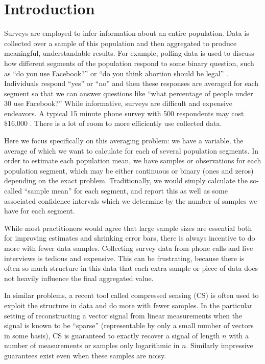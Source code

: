 \section{Introduction}
Surveys are employed to infer information about an entire population.
Data is collected over a sample of this population and then aggregated to produce meaningful, understandable results.
For example, polling data is used to discuss how different segments of the population respond to some binary question, such as ``do you use Facebook?'' or ``do you think abortion should be legal'' \cite{pew2013facebook, pew2013abortion}.
Individuals respond ``yes'' or ``no'' and then these responses are averaged for each segment so that we can answer questions like ``what percentage of people under 30 use Facebook?''
While informative, surveys are difficult and expensive endeavors.
A typical 15 minute phone survey with 500 respondents may cost \$16,000 \cite{wallacecost}.
There is a lot of room to more efficiently use collected data. %

Here we focus specifically on this averaging problem: we have a variable, the average of which we want to calculate for each of several population segments. 
In order to estimate each population mean, we have samples or observations for each population segment, which may be either continuous or binary (ones and zeros) depending on the exact problem. 
Traditionally, we would simply calculate the so-called ``sample mean'' for each segment, and report this as well as some associated confidence intervals which we determine by the number of samples we have for each segment.

While most practitioners would agree that large sample sizes are essential both for improving estimates and shrinking error bars, there is always incentive to do more with fewer data samples.
Collecting survey data from phone calls and live interviews is tedious and expensive.
This can be frustrating, because there is often so much structure in this data that each extra sample or piece of data does not heavily influence the final aggregated value.

In similar problems, a recent tool called compressed sensing (CS) is often used to exploit the structure in data and do more with fewer samples.
In the particular setting of reconstructing a vector signal from linear measurements when the signal is known to be ``sparse'' (representable by only a small number of vectors in some basis), CS is guaranteed to exactly recover a signal of length $n$ with a number of measurements or samples only logarithmic in $n$.
Similarly impressive guarantees exist even when these samples are noisy.

